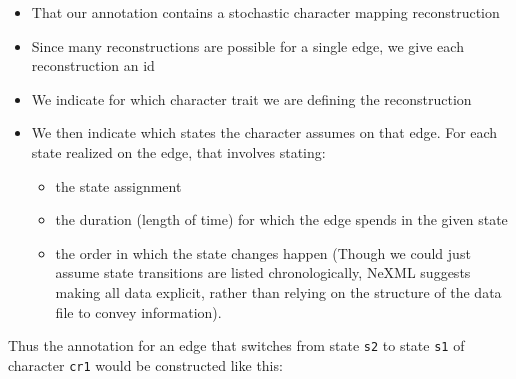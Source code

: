 \documentclass[author-year, review, 11pt]{components/elsarticle} %
\begin{document}
\begin{itemize}
\itemsep1pt\parskip0pt
\item
  That our annotation contains a stochastic character mapping
  reconstruction
\item
  Since many reconstructions are possible for a single edge, we give
  each reconstruction an id
\item
  We indicate for which character trait we are defining the
  reconstruction
\item
  We then indicate which states the character assumes on that edge. For
  each state realized on the edge, that involves stating:

  \begin{itemize}
  \itemsep1pt\parskip0pt
  \item
    the state assignment
  \item
    the duration (length of time) for which the edge spends in the given
    state
  \item
    the order in which the state changes happen (Though we could just
    assume state transitions are listed chronologically, NeXML suggests
    making all data explicit, rather than relying on the structure of
    the data file to convey information).
  \end{itemize}
\end{itemize}

Thus the annotation for an edge that switches from state \texttt{s2} to
state \texttt{s1} of character \texttt{cr1} would be constructed like
this:
\end{document}
